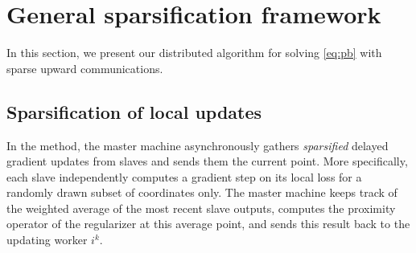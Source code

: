 \section{General sparsification framework}\label{sec:distributed-sparse}

In this section, we present our distributed algorithm for solving \eqref{eq:pb} with sparse upward communications.


\subsection{Sparsification of local updates}\label{sec:algo}


In the  method, the master machine asynchronously gathers \emph{sparsified} delayed gradient updates from slaves and sends them the current point. More specifically, each slave independently computes a gradient step on its local loss for a randomly drawn subset of coordinates only.
The master machine keeps track of the weighted average of the most recent slave outputs, computes the proximity operator of the regularizer at this average point, and sends this result back to the updating worker $i^k$. 


